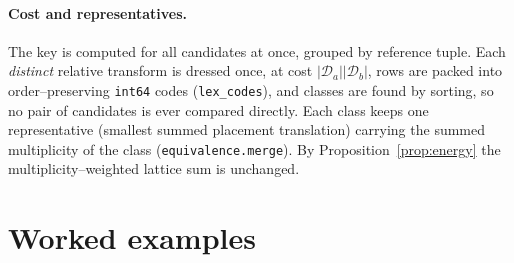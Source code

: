 \documentclass[11pt]{article}
\theoremstyle{definition}
\newcommand{\Dgrp}{\mathcal{D}}
\begin{document}
\paragraph{Cost and representatives.} The key is computed for all candidates at
once, grouped by reference tuple. Each \emph{distinct} relative transform is
dressed once, at cost $|\Dgrp_a||\Dgrp_b|$, rows are packed into order--preserving
\texttt{int64} codes (\texttt{lex\_codes}), and classes are found by sorting, so
no pair of candidates is ever compared directly. Each class keeps one
representative (smallest summed placement translation) carrying the summed
multiplicity of the class (\texttt{equivalence.merge}). By
Proposition~\ref{prop:energy} the multiplicity--weighted lattice sum is unchanged.

\section{Worked examples}\label{sec:example}
\end{document}
